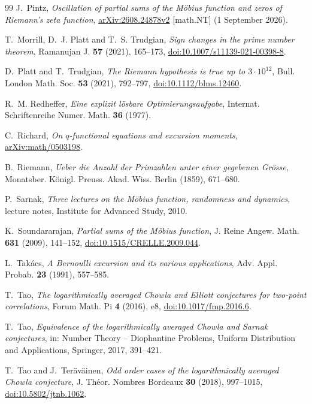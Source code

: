 \documentclass[11pt,reqno]{amsart}
\numberwithin{equation}{section}
\theoremstyle{plain}
\theoremstyle{definition}
\theoremstyle{remark}
\begin{document}
\begin{thebibliography}{99}
J.~Pintz, \emph{Oscillation of partial sums of the M\"obius function and
zeros of Riemann's zeta function}, \href{https://arxiv.org/abs/2608.24878v2}{arXiv:2608.24878v2} [math.NT] (1 September 2026).

T.~Morrill, D.~J. Platt and T.~S. Trudgian,
\emph{Sign changes in the prime number theorem},
Ramanujan J. \textbf{57} (2021), 165--173,
\href{https://doi.org/10.1007/s11139-021-00398-8}{doi:10.1007/s11139-021-00398-8}.

D.~Platt and T.~Trudgian, \emph{The Riemann hypothesis is true up to
$3\cdot10^{12}$}, Bull. London Math. Soc. \textbf{53} (2021), 792--797,
\href{https://doi.org/10.1112/blms.12460}{doi:10.1112/blms.12460}.

R.~M. Redheffer, \emph{Eine explizit l\"osbare Optimierungsaufgabe}, Internat.
Schriftenreihe Numer. Math. \textbf{36} (1977).

C.~Richard, \emph{On $q$-functional equations and excursion moments},
\href{https://arxiv.org/abs/math/0503198}{arXiv:math/0503198}.

B.~Riemann, \emph{Ueber die Anzahl der Primzahlen unter einer gegebenen
Gr\"osse}, Monatsber. K\"onigl. Preuss. Akad. Wiss. Berlin (1859), 671--680.

P.~Sarnak, \emph{Three lectures on the M\"obius function, randomness and
dynamics}, lecture notes, Institute for Advanced Study, 2010.

K.~Soundararajan, \emph{Partial sums of the M\"obius function}, J. Reine
Angew. Math. \textbf{631} (2009), 141--152,
\href{https://doi.org/10.1515/CRELLE.2009.044}{doi:10.1515/CRELLE.2009.044}.

L.~Tak\'acs, \emph{A Bernoulli excursion and its various applications},
Adv. Appl. Probab. \textbf{23} (1991), 557--585.

T.~Tao, \emph{The logarithmically averaged Chowla and Elliott conjectures for
two-point correlations}, Forum Math. Pi \textbf{4} (2016), e8,
\href{https://doi.org/10.1017/fmp.2016.6}{doi:10.1017/fmp.2016.6}.

T.~Tao, \emph{Equivalence of the logarithmically averaged Chowla and Sarnak
conjectures}, in: Number Theory -- Diophantine Problems, Uniform
Distribution and Applications, Springer, 2017, 391--421.

T.~Tao and J.~Ter\"av\"ainen, \emph{Odd order cases of the logarithmically
averaged Chowla conjecture}, J. Th\'eor. Nombres Bordeaux \textbf{30} (2018),
997--1015,
\href{https://doi.org/10.5802/jtnb.1062}{doi:10.5802/jtnb.1062}.


\end{thebibliography}
\end{document}
